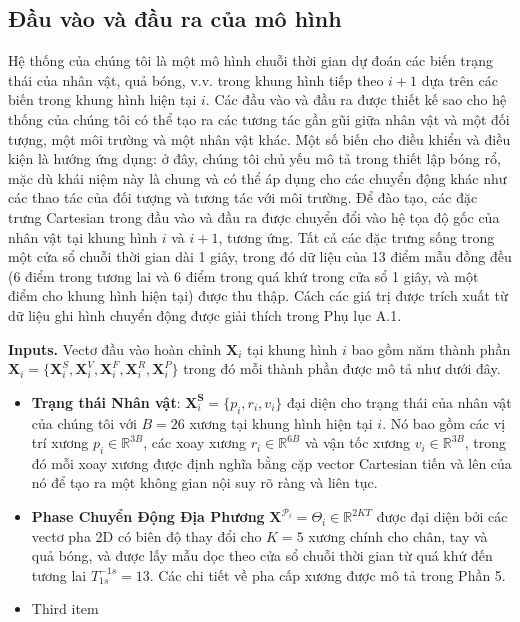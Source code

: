 \subsection{Đầu vào và đầu ra của mô hình}
\label{System}




Hệ thống của chúng tôi là một mô hình chuỗi thời gian dự đoán các biến trạng thái của nhân vật, quả bóng, v.v. trong khung hình tiếp theo $i + 1$ dựa trên các biến trong khung hình hiện tại $i$. Các đầu vào và đầu ra được thiết kế sao cho hệ thống của chúng tôi có thể tạo ra các tương tác gần gũi giữa nhân vật và một đối tượng, một môi trường và một nhân vật khác. Một số biến cho điều khiển và điều kiện là hướng ứng dụng: ở đây, chúng tôi chủ yếu mô tả trong thiết lập bóng rổ, mặc dù khái niệm này là chung và có thể áp dụng cho các chuyển động khác như các thao tác của đối tượng và tương tác với môi trường. Để đào tạo, các đặc trưng Cartesian trong đầu vào và đầu ra được chuyển đổi vào hệ tọa độ gốc của nhân vật tại khung hình $i$ và $i + 1$, tương ứng. Tất cả các đặc trưng sống trong một cửa sổ chuỗi thời gian dài 1 giây, trong đó dữ liệu của 13 điểm mẫu đồng đều (6 điểm trong tương lai và 6 điểm trong quá khứ trong cửa sổ 1 giây, và một điểm cho khung hình hiện tại) được thu thập. Cách các giá trị được trích xuất từ dữ liệu ghi hình chuyển động được giải thích trong Phụ lục A.1.

\textbf{Inputs.} Vectơ đầu vào hoàn chỉnh $\textbf{X}_i$ tại khung hình $i$ bao gồm năm thành phần $\textbf{X}_i = \{ \textbf{X}^S_i, \textbf{X}^V_i, \textbf{X}^F_i, \textbf{X}^R_i, \textbf{X}^P_i \}$ trong đó mỗi thành phần được mô tả như dưới đây.

\begin{itemize}
	\item \textbf{Trạng thái Nhân vật}: \(\textbf{X}^\textbf{S}_i = \{p_i, r_i, v_i\}\) đại diện cho trạng thái của nhân vật của chúng tôi với \(B = 26\) xương tại khung hình hiện tại \(i\). Nó bao gồm các vị trí xương \(p_i \in \mathbb{R}^{3B}\), các xoay xương \(r_i \in \mathbb{R}^{6B}\) và vận tốc xương \(v_i \in \mathbb{R}^{3B}\), trong đó mỗi xoay xương được định nghĩa bằng cặp vector Cartesian tiến và lên của nó để tạo ra một không gian nội suy rõ ràng và liên tục.
	\item \textbf{Phase Chuyển Động Địa Phương} $\textbf{X}^{\mathcal{P}_i} = \Theta_i \in \mathbb{R}^{2KT}$ được đại diện bởi các vectơ pha 2D có biên độ thay đổi cho \(K = 5\) xương chính cho chân, tay và quả bóng, và được lấy mẫu dọc theo cửa sổ chuỗi thời gian từ quá khứ đến tương lai $T_{1s}^{-1s} = 13$. Các chi tiết về pha cấp xương được mô tả trong Phần 5.
	\item Third item
\end{itemize}

